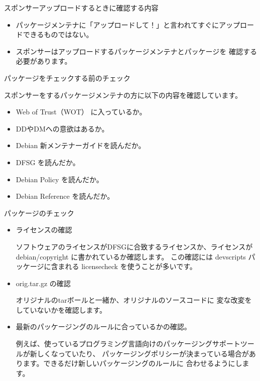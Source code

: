 \begin{frame}{スポンサーアップロードするときに確認する内容}

\begin{itemize}
\item パッケージメンテナに「アップロードして！」と言われてすぐにアップロードできるものではない。 
\item スポンサーはアップロードするパッケージメンテナとパッケージを
確認する必要があります。
\end{itemize}

\end{frame}

\begin{frame}{パッケージをチェックする前のチェック}

スポンサーをするパッケージメンテナの方に以下の内容を確認しています。

\begin{itemize}[<+->]
\item Web of Trust（WOT） に入っているか。
\item DDやDMへの意欲はあるか。
\item Debian 新メンテナーガイドを読んだか。
\item DFSG を読んだか。
\item Debian Policy を読んだか。
\item Debian Reference を読んだか。
\end{itemize}

\end{frame}

\begin{frame}{パッケージのチェック}

\begin{itemize}[<+->]

\item ライセンスの確認

ソフトウェアのライセンスがDFSGに合致するライセンスか、ライセンスが debian/copyright に書かれているか確認します。
この確認には devscripts パッケージに含まれる licensecheck を使うことが多いです。

\item orig.tar.gz の確認

オリジナルのtarボールと一緒か、オリジナルのソースコードに
変な改変をしていないかを確認します。

\item 最新のパッケージングのルールに合っているかの確認。

例えば、使っているプログラミング言語向けのパッケージングサポートツールが新しくなっていたり、
パッケージングポリシーが決まっている場合があります。できるだけ新しいパッケージングのルールに
合わせるようにします。

\end{itemize}
\end{frame}


